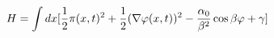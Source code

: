 \begin{equation}
H= \int dx [ {1 \over 2} \pi(x,t)^2 + {1\over 2} (\nabla \varphi(x,t))^2
- {\alpha_0 \over \beta^2} \cos \beta \varphi + \gamma ]
\end{equation}

